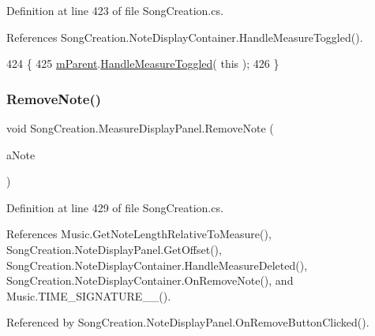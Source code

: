 Definition at line 423 of file Song\+Creation.\+cs.



References Song\+Creation.\+Note\+Display\+Container.\+Handle\+Measure\+Toggled().


\begin{DoxyCode}
424         \{
425             \hyperlink{class_song_creation_1_1_measure_display_panel_a997c583ac0b9687ff9399c9ed27d0dcb}{mParent}.\hyperlink{class_song_creation_1_1_note_display_container_af7f99e611828e62a31947a5a4d474465}{HandleMeasureToggled}( \textcolor{keyword}{this} );
426         \}
\end{DoxyCode}
\mbox{\label{class_song_creation_1_1_measure_display_panel_a56881a6bd83cad971a42aa9f9955a0ee}} 
\subsubsection{\texorpdfstring{Remove\+Note()}{RemoveNote()}}
{\footnotesize\ttfamily void Song\+Creation.\+Measure\+Display\+Panel.\+Remove\+Note (\begin{DoxyParamCaption}\item[{\hyperlink{class_song_creation_1_1_note_display_panel}{Note\+Display\+Panel}}]{a\+Note }\end{DoxyParamCaption})}



Definition at line 429 of file Song\+Creation.\+cs.



References Music.\+Get\+Note\+Length\+Relative\+To\+Measure(), Song\+Creation.\+Note\+Display\+Panel.\+Get\+Offset(), Song\+Creation.\+Note\+Display\+Container.\+Handle\+Measure\+Deleted(), Song\+Creation.\+Note\+Display\+Container.\+On\+Remove\+Note(), and Music.\+T\+I\+M\+E\+\_\+\+S\+I\+G\+N\+A\+T\+U\+R\+E\+\_\+\_().



Referenced by Song\+Creation.\+Note\+Display\+Panel.\+On\+Remove\+Button\+Clicked().


